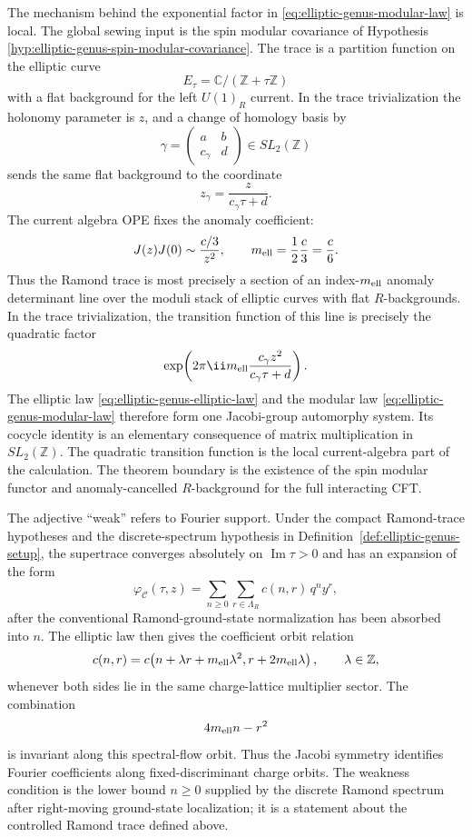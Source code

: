 The mechanism behind the exponential factor in
\eqref{eq:elliptic-genus-modular-law} is local.  The global sewing input is
the spin modular covariance of Hypothesis
\ref{hyp:elliptic-genus-spin-modular-covariance}.  The trace is a partition
function on the elliptic curve
\[
  E_\tau=\mathbb C/(\mathbb Z+\tau\mathbb Z)
\]
with a flat background for the left \(U(1)_R\) current.  In the trace
trivialization the holonomy parameter is \(z\), and a change of homology basis
by
\[
  \gamma=
  \begin{pmatrix}a&b\\ c_\gamma&d\end{pmatrix}
  \in SL_2(\mathbb Z)
\]
sends the same flat background to the coordinate
\[
  z_\gamma=\frac{z}{c_\gamma\tau+d}.
\]
The current algebra OPE fixes the anomaly coefficient:
\[
  J(z)J(0)\sim \frac{c/3}{z^2},
  \qquad
  m_{\rm ell}=\frac12\frac c3=\frac c6 .
\]
Thus the Ramond trace is most precisely a section of an
index-\(m_{\rm ell}\) anomaly determinant line over the moduli stack of
elliptic curves with flat \(R\)-backgrounds.  In the trace trivialization, the
transition function of this line is precisely the quadratic factor
\[
  \exp\!\left(
    2\pi\ii m_{\rm ell}
    \frac{c_\gamma z^2}{c_\gamma\tau+d}
  \right).
\]
The elliptic law \eqref{eq:elliptic-genus-elliptic-law} and the modular law
\eqref{eq:elliptic-genus-modular-law} therefore form one Jacobi-group
automorphy system.  Its cocycle identity is an elementary consequence of
matrix multiplication in \(SL_2(\mathbb Z)\).  The quadratic transition
function is the local current-algebra part of the calculation.  The theorem
boundary is the existence of the spin modular functor and anomaly-cancelled
\(R\)-background for the full interacting CFT.

The adjective ``weak'' refers to Fourier support.  Under the compact
Ramond-trace hypotheses and the discrete-spectrum hypothesis in
Definition~\ref{def:elliptic-genus-setup}, the supertrace converges absolutely
on \(\operatorname{Im}\tau>0\) and has an expansion of the form
\[
  \varphi_{\mathcal C}(\tau,z)
  =
  \sum_{n\ge0}\sum_{r\in\Lambda_R}
  c(n,r)\,q^n y^r ,
\]
after the conventional Ramond-ground-state normalization has been absorbed
into \(n\).  The elliptic law then gives the coefficient orbit relation
\begin{equation}
  c(n,r)
  =
  c\!\left(n+\lambda r+m_{\rm ell}\lambda^2,
    r+2m_{\rm ell}\lambda\right),
  \qquad \lambda\in\mathbb Z,
  \label{eq:elliptic-genus-coefficient-orbit}
\end{equation}
whenever both sides lie in the same charge-lattice multiplier sector.  The
combination
\[
  4m_{\rm ell}n-r^2
\]
is invariant along this spectral-flow orbit.  Thus the Jacobi symmetry
identifies Fourier coefficients along fixed-discriminant charge orbits.  The
weakness condition is the lower bound \(n\ge0\) supplied by the discrete
Ramond spectrum after right-moving ground-state localization; it is a
statement about the controlled Ramond trace defined above.

